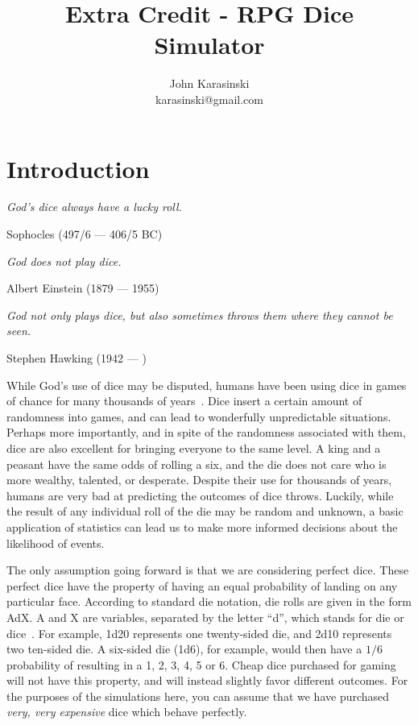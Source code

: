 \documentclass[twocolumn,letterpaper]{article}  %
\begin{document}
\title{Extra Credit - RPG Dice Simulator}
\author{%
John Karasinski\\
karasinski@gmail.com
}
\date{}

\maketitle

\thispagestyle{plain}
\pagestyle{plain}

\section{Introduction}

\epigraph{\small\itshape God's dice always have a lucky roll.}{Sophocles (497/6 --- 406/5 BC)}%
\vspace{-2em}
\epigraph{\small\itshape God does not play dice.}{Albert Einstein (1879 --- 1955)}%
\vspace{-2em}
\epigraph{\small\itshape God not only plays dice, but also sometimes throws them where they cannot be seen.}{Stephen Hawking (1942 --- \hspace{1.5em})}%

While God's use of dice may be disputed, humans have been using dice in games of chance for many thousands of years~\cite{history}. Dice insert a certain amount of randomness into games, and can lead to wonderfully unpredictable situations. Perhaps more importantly, and in spite of the randomness associated with them, dice are also excellent for bringing everyone to the same level. A king and a peasant have the same odds of rolling a six, and the die does not care who is more wealthy, talented, or desperate. Despite their use for thousands of years, humans are very bad at predicting the outcomes of dice throws. Luckily, while the result of any individual roll of the die may be random and unknown, a basic application of statistics can lead us to make more informed decisions about the likelihood of events.

The only assumption going forward is that we are considering perfect dice. These perfect dice have the property of having an equal probability of landing on any particular face. According to standard die notation, die rolls are given in the form AdX. A and X are variables, separated by the letter ``d'', which stands for die or dice~\cite{dice_notation}. For example, 1d20 represents one twenty-sided die, and 2d10 represents two ten-sided die. A six-sided die (1d6), for example, would then have a $1/6$ probability of resulting in a 1, 2, 3, 4, 5 or 6. Cheap dice purchased for gaming will not have this property, and will instead slightly favor different outcomes. For the purposes of the simulations here, you can assume that we have purchased \textit{very, very expensive} dice which behave perfectly.
\end{document}

